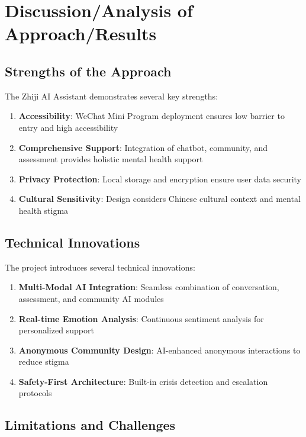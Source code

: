 \section{Discussion/Analysis of Approach/Results}
\label{sec:discussion}

\subsection{Strengths of the Approach}

The Zhiji AI Assistant demonstrates several key strengths:

\begin{enumerate}
    \item \textbf{Accessibility}: WeChat Mini Program deployment ensures low barrier to entry and high accessibility
    \item \textbf{Comprehensive Support}: Integration of chatbot, community, and assessment provides holistic mental health support
    \item \textbf{Privacy Protection}: Local storage and encryption ensure user data security
    \item \textbf{Cultural Sensitivity}: Design considers Chinese cultural context and mental health stigma
\end{enumerate}

\subsection{Technical Innovations}

The project introduces several technical innovations:

\begin{enumerate}
    \item \textbf{Multi-Modal AI Integration}: Seamless combination of conversation, assessment, and community AI modules
    \item \textbf{Real-time Emotion Analysis}: Continuous sentiment analysis for personalized support
    \item \textbf{Anonymous Community Design}: AI-enhanced anonymous interactions to reduce stigma
    \item \textbf{Safety-First Architecture}: Built-in crisis detection and escalation protocols
\end{enumerate}

\subsection{Limitations and Challenges}

